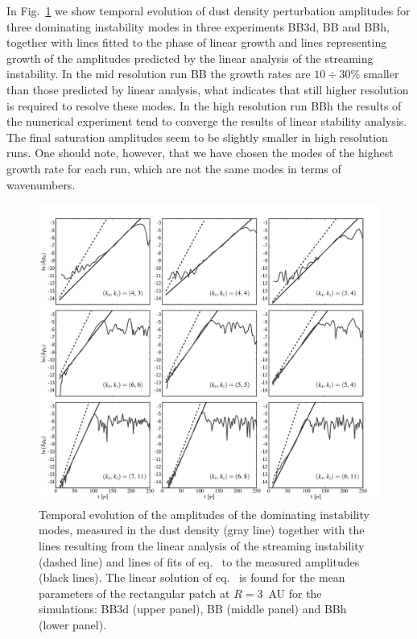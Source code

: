 In Fig.~\ref{fig8} we show temporal evolution of dust density perturbation
amplitudes for three dominating instability modes in three experiments BB3d, BB
and BBh, together with lines fitted to the phase of linear growth and  lines
representing growth of the amplitudes predicted by the linear analysis of the
streaming instability.  In the mid resolution run BB the growth rates  are
$10\div30\%$ smaller than those predicted by linear analysis, what indicates
that still higher resolution is required to resolve these modes. In the high
resolution run BBh the results of the numerical experiment tend to converge the
results of linear stability analysis.  The final saturation amplitudes seem to
be slightly smaller in high resolution runs. One should note, however, that we
have chosen the modes of the highest growth rate for each run, which are not the
same modes in terms of wavenumbers. 
 
\begin{figure} 
   \includegraphics[width=0.98\linewidth]{figures/fig8}
   \caption{Temporal evolution of the amplitudes of the dominating instability
      modes, measured in the dust density (gray line) together with the lines
      resulting from the linear analysis of the streaming instability (dashed
      line) and lines of fits of eq.~ to the measured amplitudes
      (black lines).
      The linear solution of eq.~ is found for the mean
      parameters of the rectangular patch at $R=3$~AU for the simulations: BB3d
      (upper panel), BB (middle panel) and BBh (lower panel). 
   }
   \label{fig8}
\end{figure}


